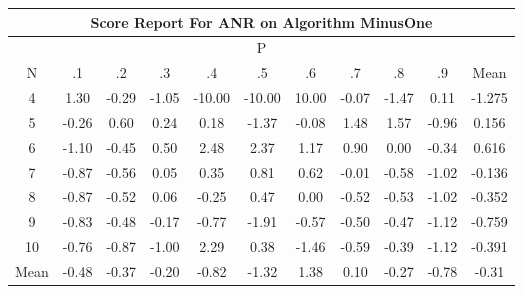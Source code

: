 \documentclass[11pt,a4paper]{report}
\begin{document}
\begin{longtable}{ | c || c | c | c | c | c | c | c | c | c || c |}
\hline
\multicolumn{11}{|c|}{ Score Report For ANR on Algorithm MinusOne} \\
\hline
\multicolumn{11}{|c|}{ P } \\
\hline
N & .1 & .2 & .3 & .4 & .5 & .6 & .7 & .8 & .9 & Mean\\
 \hline
 \hline
 \endhead
  4 &  \cellcolor[HTML]{DFDFFF} 1.30 &  \cellcolor[HTML]{FFF7F7} -0.29 &  \cellcolor[HTML]{FFE7E7} -1.05 &  \cellcolor[HTML]{FF0000} -10.00 &  \cellcolor[HTML]{FF0000} -10.00 &  \cellcolor[HTML]{0808FF} 10.00 &  \cellcolor[HTML]{FFFFFF} -0.07 &  \cellcolor[HTML]{FFD7D7} -1.47 &  \cellcolor[HTML]{FFFFFF} 0.11 & -1.275 \\
  5 &  \cellcolor[HTML]{FFF7F7} -0.26 &  \cellcolor[HTML]{EFEFFF} 0.60 &  \cellcolor[HTML]{F7F7FF} 0.24 &  \cellcolor[HTML]{F7F7FF} 0.18 &  \cellcolor[HTML]{FFDFDF} -1.37 &  \cellcolor[HTML]{FFFFFF} -0.08 &  \cellcolor[HTML]{D7D7FF} 1.48 &  \cellcolor[HTML]{D7D7FF} 1.57 &  \cellcolor[HTML]{FFE7E7} -0.96 & 0.156 \\
  6 &  \cellcolor[HTML]{FFE7E7} -1.10 &  \cellcolor[HTML]{FFF7F7} -0.45 &  \cellcolor[HTML]{EFEFFF} 0.50 &  \cellcolor[HTML]{BFBFFF} 2.48 &  \cellcolor[HTML]{C7C7FF} 2.37 &  \cellcolor[HTML]{DFDFFF} 1.17 &  \cellcolor[HTML]{E7E7FF} 0.90 &  \cellcolor[HTML]{FFFFFF} 0.00 &  \cellcolor[HTML]{FFF7F7} -0.34 & 0.616 \\
  7 &  \cellcolor[HTML]{FFE7E7} -0.87 &  \cellcolor[HTML]{FFEFEF} -0.56 &  \cellcolor[HTML]{FFFFFF} 0.05 &  \cellcolor[HTML]{F7F7FF} 0.35 &  \cellcolor[HTML]{E7E7FF} 0.81 &  \cellcolor[HTML]{EFEFFF} 0.62 &  \cellcolor[HTML]{FFFFFF} -0.01 &  \cellcolor[HTML]{FFEFEF} -0.58 &  \cellcolor[HTML]{FFE7E7} -1.02 & -0.136 \\
  8 &  \cellcolor[HTML]{FFE7E7} -0.87 &  \cellcolor[HTML]{FFEFEF} -0.52 &  \cellcolor[HTML]{FFFFFF} 0.06 &  \cellcolor[HTML]{FFF7F7} -0.25 &  \cellcolor[HTML]{F7F7FF} 0.47 &  \cellcolor[HTML]{FFFFFF} 0.00 &  \cellcolor[HTML]{FFEFEF} -0.52 &  \cellcolor[HTML]{FFEFEF} -0.53 &  \cellcolor[HTML]{FFE7E7} -1.02 & -0.352 \\
  9 &  \cellcolor[HTML]{FFE7E7} -0.83 &  \cellcolor[HTML]{FFEFEF} -0.48 &  \cellcolor[HTML]{FFF7F7} -0.17 &  \cellcolor[HTML]{FFEFEF} -0.77 &  \cellcolor[HTML]{FFCFCF} -1.91 &  \cellcolor[HTML]{FFEFEF} -0.57 &  \cellcolor[HTML]{FFEFEF} -0.50 &  \cellcolor[HTML]{FFF7F7} -0.47 &  \cellcolor[HTML]{FFDFDF} -1.12 & -0.759 \\
  10 &  \cellcolor[HTML]{FFEFEF} -0.76 &  \cellcolor[HTML]{FFE7E7} -0.87 &  \cellcolor[HTML]{FFE7E7} -1.00 &  \cellcolor[HTML]{C7C7FF} 2.29 &  \cellcolor[HTML]{F7F7FF} 0.38 &  \cellcolor[HTML]{FFD7D7} -1.46 &  \cellcolor[HTML]{FFEFEF} -0.59 &  \cellcolor[HTML]{FFF7F7} -0.39 &  \cellcolor[HTML]{FFDFDF} -1.12 & -0.391 \\
 \hline
 \hline
Mean &  \cellcolor[HTML]{FFEFEF} -0.48 &  \cellcolor[HTML]{FFF7F7} -0.37 &  \cellcolor[HTML]{FFF7F7} -0.20 &  \cellcolor[HTML]{FFE7E7} -0.82 &  \cellcolor[HTML]{FFDFDF} -1.32 &  \cellcolor[HTML]{DFDFFF} 1.38 &  \cellcolor[HTML]{FFFFFF} 0.10 &  \cellcolor[HTML]{FFF7F7} -0.27 &  \cellcolor[HTML]{FFEFEF} -0.78 &  \cellcolor[HTML]{FFF7F7} -0.31
\end{longtable}
\end{document}
